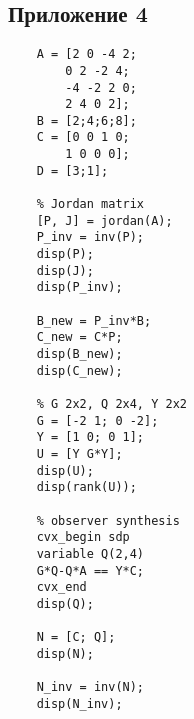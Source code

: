 \documentclass[a4paper, 12pt]{article}
\begin{document}
    \subsection{Приложение 4}
    \begin{lstlisting}[label=task4, caption={Программа для четвертого задания}]
    % input data
    A = [2 0 -4 2;
        0 2 -2 4;
        -4 -2 2 0;
        2 4 0 2];
    B = [2;4;6;8];
    C = [0 0 1 0;
        1 0 0 0];
    D = [3;1];

    % Jordan matrix
    [P, J] = jordan(A);
    P_inv = inv(P);
    disp(P);
    disp(J);
    disp(P_inv);

    B_new = P_inv*B;
    C_new = C*P;
    disp(B_new);
    disp(C_new);

    % G 2x2, Q 2x4, Y 2x2
    G = [-2 1; 0 -2];
    Y = [1 0; 0 1];
    U = [Y G*Y];
    disp(U);
    disp(rank(U));

    % observer synthesis
    cvx_begin sdp
    variable Q(2,4)
    G*Q-Q*A == Y*C;
    cvx_end
    disp(Q);

    N = [C; Q];
    disp(N);

    N_inv = inv(N);
    disp(N_inv);
    \end{lstlisting}
\end{document}
